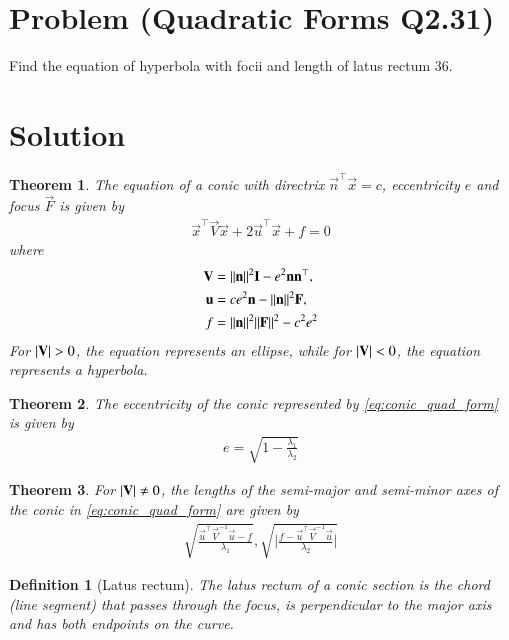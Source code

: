 \documentclass[journal,12pt,twocolumn]{IEEEtran}
\newtheorem{theorem}{Theorem}[section]
\newtheorem{definition}{Definition}[section]
\begin{document}
\section{Problem (Quadratic Forms Q2.31)}
Find the equation of hyperbola with focii  and length of latus rectum 36.
\section{Solution}
\begin{theorem}
The equation of a conic with directrix $\vec{n}^{\top}\vec{x} = c$, eccentricity $e$ and focus $\vec{F}$ is given by 
\begin{align}
    \label{eq:conic_quad_form}
    \vec{x}^{\top}\vec{V}\vec{x}+2\vec{u}^{\top}\vec{x}+f=0
    \end{align}
where     
\begin{align}
\label{eq:conic_quad_form_v}
\mathbf{V} &=\lVert\mathbf{n}\rVert^2\mathbf{I}-e^2\mathbf{n}\mathbf{n}^{\top}, \\
\label{eq:conic_quad_form_u}
\mathbf{u} &= ce^2\mathbf{n}-\lVert\mathbf{n}\rVert^2\mathbf{F}, \\
\label{eq:conic_quad_form_f}
f &= \lVert\mathbf{n}\rVert^2\lVert\mathbf{F}\rVert^2-c^2e^2
\end{align}
For $\vert\mathbf{V}\vert>0$, the equation represents an ellipse, while for $\vert\mathbf{V}\vert<0$, the equation represents a hyperbola.
\end{theorem}
\begin{theorem}
The eccentricity of the conic represented by \eqref{eq:conic_quad_form} is given by
\begin{align}
e= \sqrt{1-\frac{\lambda_1}{\lambda_2}}
\label{eq:e}
\end{align}
\end{theorem}
\begin{theorem}
For $\vert\mathbf{V}\vert \ne 0$, the lengths of the semi-major and semi-minor axes of the conic in \eqref{eq:conic_quad_form} are given by 
\begin{align} 
\sqrt{\frac{\vec{u}^{\top}\vec{V}^{-1}\vec{u} -f}{\lambda_1}}, 
\sqrt{\bigg | \frac{f-\vec{u}^{\top}\vec{V}^{-1}\vec{u}}{\lambda_2}\bigg | }
\label{eq:ab}
\end{align} 
\end{theorem}
\begin{definition}[Latus rectum]
The latus rectum of a conic section is the chord (line segment) that passes through the focus, is perpendicular to the major axis and has both endpoints on the curve.
\end{definition}
\end{document}
